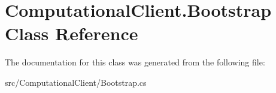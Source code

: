 \hypertarget{class_computational_client_1_1_bootstrap}{}\section{Computational\+Client.\+Bootstrap Class Reference}
\label{class_computational_client_1_1_bootstrap}


The documentation for this class was generated from the following file\+:\begin{DoxyCompactItemize}
\item 
src/\+Computational\+Client/Bootstrap.\+cs\end{DoxyCompactItemize}
